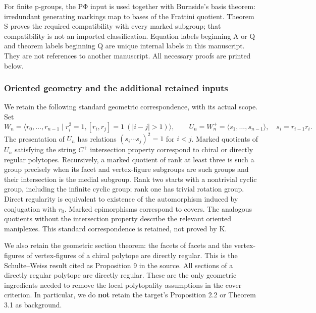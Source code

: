 \documentclass[
  10pt,
  letterpaper,
]{article}
\begin{document}
For finite p-groups, the PΦ input is used together with Burnside's basis
theorem: irredundant generating markings map to bases of the Frattini
quotient. Theorem S proves the required compatibility with every marked
subgroup; that compatibility is not an imported classification. Equation
labels beginning A or Q and theorem labels beginning Q are unique
internal labels in this manuscript. They are not references to another
manuscript. All necessary proofs are printed below.

\subsubsection{Oriented geometry and the additional retained
inputs}\label{oriented-geometry-and-the-additional-retained-inputs}

We retain the following standard geometric correspondence, with its
actual scope. Set \[
 W_n=\langle r_0,\ldots,r_{n-1}\mid r_i^2=1,
 [r_i,r_j]=1\ (|i-j|>1)\rangle,
 \qquad U_n=W_n^+=\langle s_1,\ldots,s_{n-1}\rangle,
 \quad s_i=r_{i-1}r_i.
\] The presentation of \(U_n\) has relations \((s_i\cdots s_j)^2=1\) for
\(i<j\). Marked quotients of \(U_n\) satisfying the string \(C^+\)
intersection property correspond to chiral or directly regular
polytopes. Recursively, a marked quotient of rank at least three is such
a group precisely when its facet and vertex-figure subgroups are such
groups and their intersection is the medial subgroup. Rank two starts
with a nontrivial cyclic group, including the infinite cyclic group;
rank one has trivial rotation group. Direct regularity is equivalent to
existence of the automorphism induced by conjugation with \(r_0\).
Marked epimorphisms correspond to covers. The analogous quotients
without the intersection property describe the relevant oriented
maniplexes. This standard correspondence is retained, not proved by K.

We also retain the geometric section theorem: the facets of facets and
the vertex-figures of vertex-figures of a chiral polytope are directly
regular. This is the Schulte--Weiss result cited as Proposition 9 in the
source. All sections of a directly regular polytope are directly
regular. These are the only geometric ingredients needed to remove the
local polytopality assumptions in the cover criterion. In particular, we
do \textbf{not} retain the target's Proposition 2.2 or Theorem 3.1 as
background.
\end{document}
